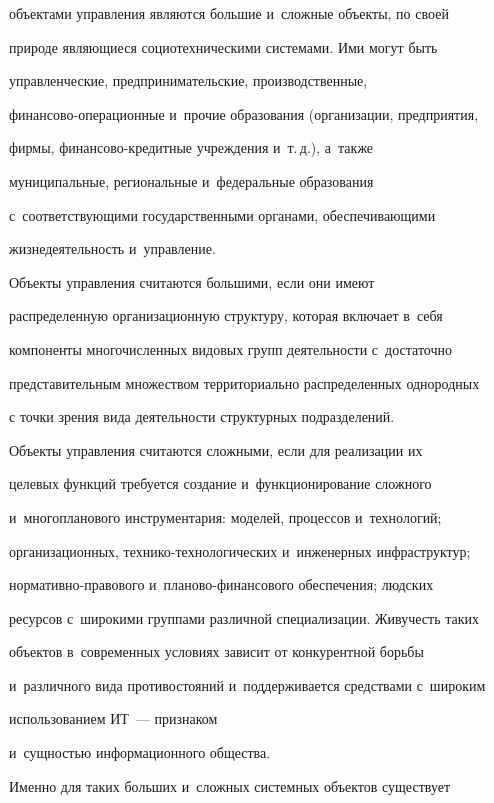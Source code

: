 объектами управления являются большие и~сложные объекты, по своей 

природе являющиеся социотехническими сис\-те\-ма\-ми. Ими могут быть 

управленческие, предпринимательские, производственные,  

фи\-нан\-со\-во-опе\-ра\-ци\-он\-ные и~прочие образования (организации, предприятия, 

фирмы, фи\-нан\-со\-во-кре\-дит\-ные учреждения и~т.\,д.), а~так\-же 

муниципальные, региональные и~федеральные образования 

с~соответствующими государственными органами, обеспечивающими 

жизнедеятельность и~управление. 

    

    Объекты управления считаются большими, если они имеют 

распределенную организационную структуру, которая включает в~себя 

компоненты многочисленных видовых групп деятельности с~достаточно 

представительным множеством территориально распределенных однородных 

с точки зрения вида деятельности структурных подразделений. 

    

    Объекты управления считаются сложными, если для реализации их 

целевых функций требуется создание и~функционирование сложного 

и~многопланового инструментария: моделей, процессов и~технологий; 

организационных, тех\-ни\-ко-тех\-но\-ло\-ги\-че\-ских и~инженерных инфраструктур; 

нор\-ма\-тив\-но-пра\-во\-во\-го и~пла\-но\-во-фи\-нан\-со\-во\-го обеспечения; людских 

ресурсов с~широкими группами различной специализации. Живучесть таких 

объектов в~современных условиях зависит от конкурентной борьбы 

и~различного вида противостояний и~поддерживается средствами с~широким 

использованием ИТ~--- признаком 

и~сущностью информационного общества. 

    

    Именно для таких больших и~сложных сис\-тем\-ных объектов существует 

